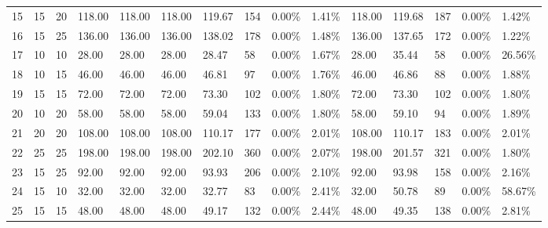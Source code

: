 \documentclass[
  a4paper,
,tablecaptionabove
]{scrartcl}
\begin{document}
\begin{longtable}{l|ll|ll|lllll|lllll}
  15 & 15                         & 20                         & 118.00                    & 118.00      & 118.00        & 119.67 & 154 & 0.00\%  & 1.41\% & 118.00 & 119.68 & 187 & 0.00\%  & 1.42\%  \\
  16 & 15                         & 25                         & 136.00                    & 136.00      & 136.00        & 138.02 & 178 & 0.00\%  & 1.48\% & 136.00 & 137.65 & 172 & 0.00\%  & 1.22\%  \\
  17 & 10                         & 10                         & 28.00                     & 28.00       & 28.00         & 28.47  & 58  & 0.00\%  & 1.67\% & 28.00  & 35.44  & 58  & 0.00\%  & 26.56\% \\
  18 & 10                         & 15                         & 46.00                     & 46.00       & 46.00         & 46.81  & 97  & 0.00\%  & 1.76\% & 46.00  & 46.86  & 88  & 0.00\%  & 1.88\%  \\
  19 & 15                         & 15                         & 72.00                     & 72.00       & 72.00         & 73.30  & 102 & 0.00\%  & 1.80\% & 72.00  & 73.30  & 102 & 0.00\%  & 1.80\%  \\
  20 & 10                         & 20                         & 58.00                     & 58.00       & 58.00         & 59.04  & 133 & 0.00\%  & 1.80\% & 58.00  & 59.10  & 94  & 0.00\%  & 1.89\%  \\
  21 & 20                         & 20                         & 108.00                    & 108.00      & 108.00        & 110.17 & 177 & 0.00\%  & 2.01\% & 108.00 & 110.17 & 183 & 0.00\%  & 2.01\%  \\
  22 & 25                         & 25                         & 198.00                    & 198.00      & 198.00        & 202.10 & 360 & 0.00\%  & 2.07\% & 198.00 & 201.57 & 321 & 0.00\%  & 1.80\%  \\
  23 & 15                         & 25                         & 92.00                     & 92.00       & 92.00         & 93.93  & 206 & 0.00\%  & 2.10\% & 92.00  & 93.98  & 158 & 0.00\%  & 2.16\%  \\
  24 & 15                         & 10                         & 32.00                     & 32.00       & 32.00         & 32.77  & 83  & 0.00\%  & 2.41\% & 32.00  & 50.78  & 89  & 0.00\%  & 58.67\% \\
  25 & 15                         & 15                         & 48.00                     & 48.00       & 48.00         & 49.17  & 132 & 0.00\%  & 2.44\% & 48.00  & 49.35  & 138 & 0.00\%  & 2.81\%  \\

\end{longtable}
\end{document}
